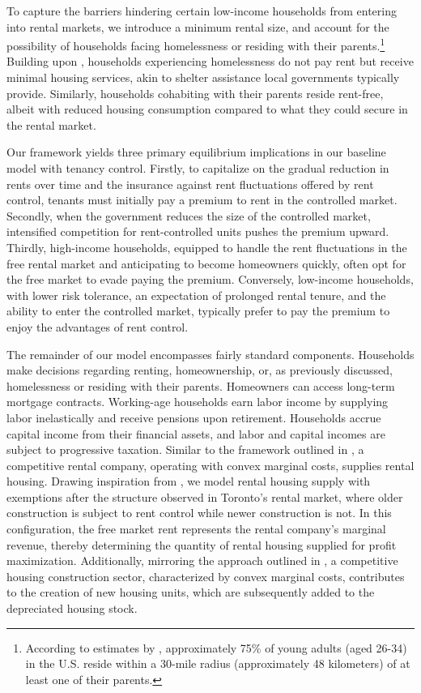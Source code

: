 \documentclass[parskip=full]{article}
\begin{document}
To capture the barriers hindering certain low-income households from entering into rental markets, we introduce a minimum rental size, and account for the possibility of households facing homelessness or residing with their parents.\footnote{According to estimates by \citet{spatial_distance-2020}, approximately 75\% of young adults (aged 26-34) in the U.S. reside within a 30-mile radius (approximately 48 kilometers) of at least one of their parents.} Building upon \citet{az-2024}, households experiencing homelessness do not pay rent but receive minimal housing services, akin to shelter assistance local governments typically provide. Similarly, households cohabiting with their parents reside rent-free, albeit with reduced housing consumption compared to what they could secure in the rental market.

Our framework yields three primary equilibrium implications in our baseline model with tenancy control. Firstly, to capitalize on the gradual reduction in rents over time and the insurance against rent fluctuations offered by rent control, tenants must initially pay a premium to rent in the controlled market. Secondly, when the government reduces the size of the controlled market, intensified competition for rent-controlled units pushes the premium upward. Thirdly, high-income households, equipped to handle the rent fluctuations in the free rental market and anticipating to become homeowners quickly, often opt for the free market to evade paying the premium. Conversely, low-income households, with lower risk tolerance, an expectation of prolonged rental tenure, and the ability to enter the controlled market, typically prefer to pay the premium to enjoy the advantages of rent control.

The remainder of our model encompasses fairly standard components. Households make decisions regarding renting, homeownership, or, as previously discussed, homelessness or residing with their parents. Homeowners can access long-term mortgage contracts. Working-age households earn labor income by supplying labor inelastically and receive pensions upon retirement. Households accrue capital income from their financial assets, and labor and capital incomes are subject to progressive taxation. Similar to the framework outlined in \citet{garrigaeetal-2009}, a competitive rental company, operating with convex marginal costs, supplies rental housing. Drawing inspiration from \citet{fallis-1985}, we model rental housing supply with exemptions after the structure observed in Toronto's rental market, where older construction is subject to rent control while newer construction is not. In this configuration, the free market rent represents the rental company's marginal revenue, thereby determining the quantity of rental housing supplied for profit maximization. Additionally, mirroring the approach outlined in \citet{rotberg-2022}, a competitive housing construction sector, characterized by convex marginal costs, contributes to the creation of new housing units, which are subsequently added to the depreciated housing stock.
\end{document}
